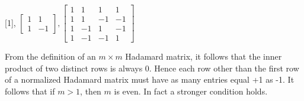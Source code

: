 [1], $\begin{bmatrix} 1 & 1 \\ 1 & -1 \end{bmatrix}, \begin{bmatrix} 1 & 1 & 1 & 1 \\ 1 & 1 & -1 & -1 \\ 1 & -1 & 1 & -1 \\ 1 & -1 & -1 & 1 \end{bmatrix}$

From the definition of an $m \times m$ Hadamard matrix, it follows that the inner product of two distinct rows is always 0. Hence each row other than the first row of a normalized Hadamard matrix must have as many entries equal +1 as -1. It follows that if $m > 1$, then $m$ is even. In fact a stronger condition holds.
